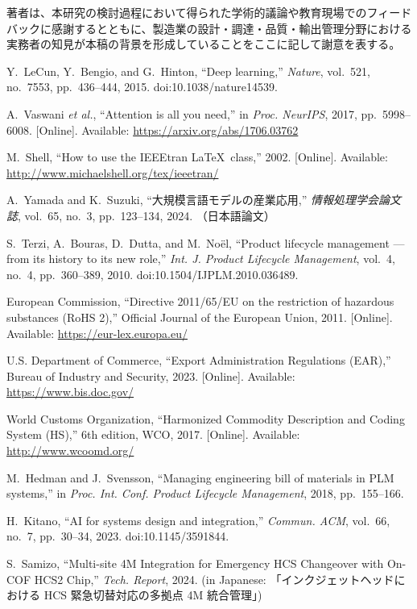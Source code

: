 \documentclass[10pt,conference]{IEEEtran}
\begin{document}
著者は、本研究の検討過程において得られた学術的議論や教育現場でのフィードバックに感謝するとともに、製造業の設計・調達・品質・輸出管理分野における実務者の知見が本稿の背景を形成していることをここに記して謝意を表する。

\begin{thebibliography}{00}

Y.~LeCun, Y.~Bengio, and G.~Hinton, ``Deep learning,'' \emph{Nature}, vol.~521,
no.~7553, pp.~436--444, 2015. doi:10.1038/nature14539.

A.~Vaswani \emph{et al.}, ``Attention is all you need,'' in \emph{Proc. NeurIPS},
2017, pp.~5998--6008. [Online]. Available: \url{https://arxiv.org/abs/1706.03762}

M.~Shell, ``How to use the {IEEEtran} \LaTeX\ class,'' 2002. [Online]. Available:
\url{http://www.michaelshell.org/tex/ieeetran/}

A.~Yamada and K.~Suzuki, ``大規模言語モデルの産業応用,'' \emph{情報処理学会論文誌}, vol.~65,
no.~3, pp.~123--134, 2024. （日本語論文）

S.~Terzi, A.~Bouras, D.~Dutta, and M.~Noël, ``Product lifecycle management — from its history to its new role,'' 
\emph{Int. J. Product Lifecycle Management}, vol.~4, no.~4, pp.~360--389, 2010. doi:10.1504/IJPLM.2010.036489.

European Commission, ``Directive 2011/65/EU on the restriction of hazardous substances (RoHS 2),'' 
Official Journal of the European Union, 2011. [Online]. Available: \url{https://eur-lex.europa.eu/}

U.S. Department of Commerce, ``Export Administration Regulations (EAR),'' 
Bureau of Industry and Security, 2023. [Online]. Available: \url{https://www.bis.doc.gov/}

World Customs Organization, ``Harmonized Commodity Description and Coding System (HS),'' 
6th edition, WCO, 2017. [Online]. Available: \url{http://www.wcoomd.org/}

M.~Hedman and J.~Svensson, ``Managing engineering bill of materials in PLM systems,'' 
in \emph{Proc. Int. Conf. Product Lifecycle Management}, 2018, pp.~155--166.

H.~Kitano, ``AI for systems design and integration,'' \emph{Commun. ACM}, vol.~66, no.~7, pp.~30--34, 2023. doi:10.1145/3591844.

S.~Samizo, ``Multi-site 4M Integration for Emergency HCS Changeover
with On-COF HCS2 Chip,'' \emph{Tech. Report}, 2024. (in Japanese: 「インクジェットヘッドにおける HCS 緊急切替対応の多拠点 4M 統合管理」)

\end{thebibliography}
\end{document}
